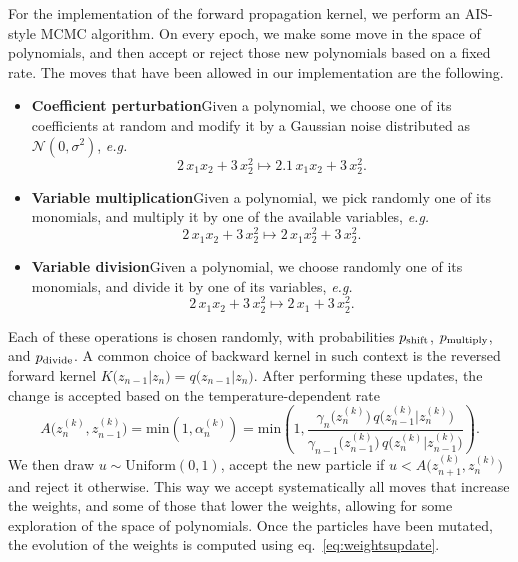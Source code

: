 \documentclass[11pt,a4paper]{article}
\begin{document}
	For the implementation of the forward propagation kernel, we perform an AIS-style MCMC algorithm. On every epoch, we make some move in the space of polynomials, and then accept or reject those new polynomials based on a fixed rate. The moves that have been allowed in our implementation are the following.
	\begin{itemize}
		\item \textbf{Coefficient perturbation}\quad Given a polynomial, we choose one of its coefficients at random and modify it by a Gaussian noise distributed as $\mathcal{N}(0,\sigma^2)$, \textit{e.g.}
		\begin{equation} \label{eq:coeffperturb}
			2\, x_1x_{2} + 3\, x_2^2 \longmapsto  2.1\, x_1x_{2} + 3\, x_2^2.
		\end{equation}
		\item \textbf{Variable multiplication}\quad Given a polynomial, we pick randomly one of its monomials, and multiply it by one of the available variables, \textit{e.g.}
		\begin{equation}
			2\, x_1x_{2} + 3\, x_2^2 \longmapsto  2\, x_1 x_2^{2} + 3\, x_2^2.
		\end{equation}
		\item \textbf{Variable division}\quad Given a polynomial, we choose randomly one of its monomials, and divide it by one of its variables, \textit{e.g.}
		\begin{equation}
			2\,x_1 x_2 + 3\, x_2^2 \longmapsto  2\, x_1 + 3\, x_2^2.
		\end{equation}
	\end{itemize}
	Each of these operations is chosen randomly, with probabilities $p_{\rm shift}$, $p_{\rm multiply}$, and $p_{\rm divide}$.
	A common choice of backward kernel in such context is the reversed forward kernel $K\big(z_{n-1}\vert z_{n}\big) = q\big(z_{n-1}\vert z_{n}\big)$.
	After performing these updates, the change is accepted based on the temperature-dependent rate
	\begin{equation}\label{eq:acceptanceratio}
		A\big(z_{n}^{(k)},z_{n-1}^{(k)}\big) = \mathrm{min} \left(1,\alpha_{n}^{(k)}\right) = \mathrm{min} \left(1,\frac{\gamma_{n}\big(z_{n}^{(k)}\big)\,q\big(z^{(k)}_{n-1}\vert z^{(k)}_{n}\big)}{\gamma_{n-1}\big(z_{n-1}^{(k)}\big)\,q\big(z^{(k)}_{n}\vert z^{(k)}_{n-1}\big)}  \right).
	\end{equation}
	We then draw $u\sim \mathrm{Uniform}(0,1)$, accept the new particle if $u<A\big(z_{n+1}^{(k)},z_{n}^{(k)}\big)$ and reject it otherwise. This way we accept systematically all moves that increase the weights, and some of those that lower the weights, allowing for some exploration of the space of polynomials.	Once the particles have been mutated, the evolution of the weights is computed using eq.~\eqref{eq:weightsupdate}.
\end{document}
